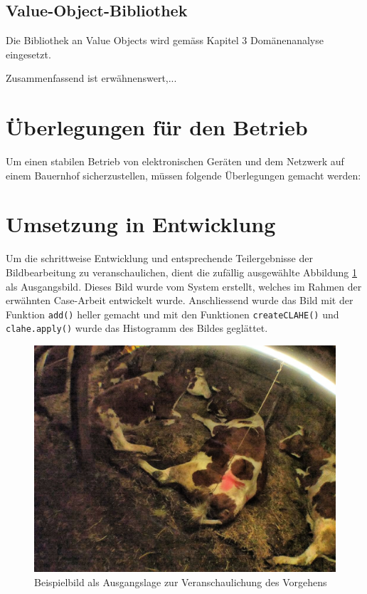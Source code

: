 \begin{landscape}
\subsection{Value-Object-Bibliothek}
Die Bibliothek an Value Objects wird gemäss Kapitel 3 Domänenanalyse eingesetzt.

Zusammenfassend ist erwähnenswert,... 

\end{landscape}
\restoregeometry %

\section{Überlegungen für den Betrieb}

Um einen stabilen Betrieb von elektronischen Geräten und dem Netzwerk auf einem Bauernhof sicherzustellen, müssen folgende Überlegungen gemacht werden:


\newpage


\section{Umsetzung in Entwicklung}
Um die schrittweise Entwicklung und entsprechende Teilergebnisse der Bildbearbeitung zu veranschaulichen, dient die zufällig ausgewählte Abbildung \ref{fig: Bild als Ausgangslage zur Veranschaulichung des Vorgehens} als Ausgangsbild. Dieses Bild wurde vom System erstellt, welches im Rahmen der erwähnten Case-Arbeit entwickelt wurde. Anschliessend wurde das Bild mit der Funktion \texttt{add()} heller gemacht und mit den Funktionen \texttt{createCLAHE()} und \texttt{clahe.apply()} wurde das Histogramm des Bildes geglättet. 

\begin{figure}[H]
	\center
	\includegraphics[scale=0.43]{Grafiken/entwicklung/1ausgangsbildBericht.jpg}
	\caption{Beispielbild als Ausgangslage zur Veranschaulichung des Vorgehens} 
	\label{fig: Bild als Ausgangslage zur Veranschaulichung des Vorgehens}
\end{figure}

